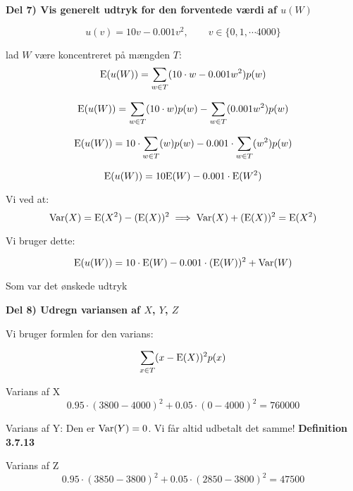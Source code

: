 \textbf{Del 7) Vis generelt udtryk for den forventede værdi af $u(W)$}

\begin{equation}
    u(v) = 10 v - 0.001 v^2, \qquad v \in \{0, 1, \cdots 4000 \}
\end{equation}

lad $W$ være koncentreret på mængden $T$:
\begin{equation}
    \text{E}(u(W)) = \sum_{w \in T} (10\cdot w - 0.001 w^2)p(w)
\end{equation}

\begin{equation}
    \text{E}(u(W)) = \sum_{w \in T} (10\cdot w)p(w) - \sum_{w \in T} (0.001 w^2)p(w)
\end{equation}


\begin{equation}
    \text{E}(u(W)) = 10\cdot\sum_{w \in T} ( w)p(w) - 0.001\cdot \sum_{w \in T} ( w^2)p(w)
\end{equation}

\begin{equation}
    \text{E}(u(W)) = 10\text{E}(W) - 0.001\cdot \text{E}(W^2)
\end{equation}

Vi ved at:
\begin{equation}
    \text{Var}(X) = \text{E}(X^2) - (\text{E}(X))^2 \implies \text{Var}(X) + (\text{E}(X))^2 = \text{E}(X^2)
\end{equation}

Vi bruger dette:

\begin{equation}
    \text{E}(u(W)) = 10\cdot\text{E}(W) - 0.001\cdot (\text{E}(W))^2 + \text{Var}(W)
\end{equation}

Som var det ønskede udtryk

\textbf{Del 8) Udregn variansen af $X$, $Y$, $Z$}

Vi bruger formlen for den varians:

\begin{equation}
    \sum_{x \in T}(x - \text{E}(X))^2p(x)
\end{equation}

Varians af X
\begin{equation}
    0.95 \cdot (3800 - 4000)^2 + 0.05 \cdot (0 - 4000)^2 = 760000
\end{equation}

Varians af Y: Den er $\text{Var}(Y)=0$. Vi får altid udbetalt det samme! \textbf{Definition 3.7.13}

Varians af Z
\begin{equation}
    0.95 \cdot (3850 -3800)^2 + 0.05 \cdot (2850 - 3800)^2 = 47500 
\end{equation}